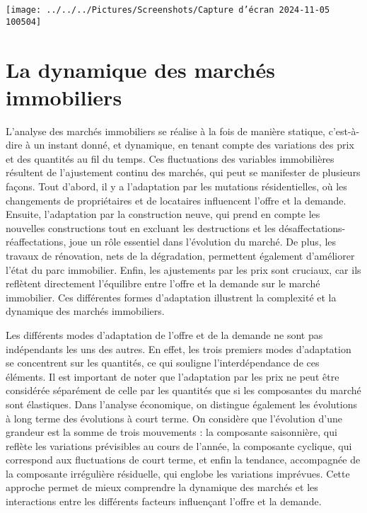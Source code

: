\documentclass[a4paper, 12pt]{report}
\begin{document}
\begin{center}
	\texttt{[image: ../../../Pictures/Screenshots/Capture d'écran 2024-11-05 100504]}
\end{center}

\chapter{La dynamique des marchés immobiliers}

L'analyse des marchés immobiliers se réalise à la fois de manière statique, c'est-à-dire à un instant donné, et dynamique, en tenant compte des variations des prix et des quantités au fil du temps. Ces fluctuations des variables immobilières résultent de l'ajustement continu des marchés, qui peut se manifester de plusieurs façons. Tout d'abord, il y a l'adaptation par les mutations résidentielles, où les changements de propriétaires et de locataires influencent l'offre et la demande. Ensuite, l'adaptation par la construction neuve, qui prend en compte les nouvelles constructions tout en excluant les destructions et les désaffectations-réaffectations, joue un rôle essentiel dans l'évolution du marché. De plus, les travaux de rénovation, nets de la dégradation, permettent également d'améliorer l'état du parc immobilier. Enfin, les ajustements par les prix sont cruciaux, car ils reflètent directement l'équilibre entre l'offre et la demande sur le marché immobilier. Ces différentes formes d'adaptation illustrent la complexité et la dynamique des marchés immobiliers.

Les différents modes d'adaptation de l'offre et de la demande ne sont pas indépendants les uns des autres. En effet, les trois premiers modes d'adaptation se concentrent sur les quantités, ce qui souligne l'interdépendance de ces éléments. Il est important de noter que l'adaptation par les prix ne peut être considérée séparément de celle par les quantités que si les composantes du marché sont élastiques. Dans l'analyse économique, on distingue également les évolutions à long terme des évolutions à court terme. On considère que l'évolution d'une grandeur est la somme de trois mouvements : la composante saisonnière, qui reflète les variations prévisibles au cours de l'année, la composante cyclique, qui correspond aux fluctuations de court terme, et enfin la tendance, accompagnée de la composante irrégulière résiduelle, qui englobe les variations imprévues. Cette approche permet de mieux comprendre la dynamique des marchés et les interactions entre les différents facteurs influençant l'offre et la demande.
\end{document}
